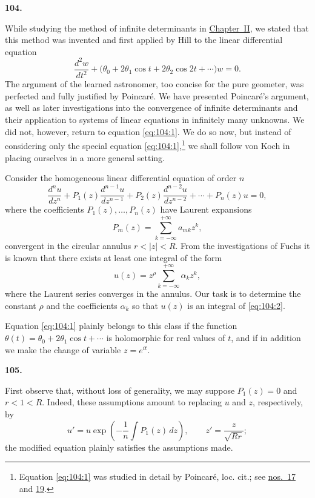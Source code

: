 \documentclass[
  paper=b5,
  fontsize=13pt,
  twoside=true,
  open=any,
  bookmarkpackage=false,
  chapterprefix=true,
  headings=normal
]{scrbook}
\theoremstyle{definition}
\newcommand{\numberedparagraph}[1]{%
  \par\medskip\phantomsection\label{sec:#1}%
  \noindent\textbf{#1.}\enspace
}
\begin{document}
\numberedparagraph{104}
While studying the method of infinite determinants in \hyperref[chap:2]{Chapter~II}, we stated
that this method was invented and first applied by Hill to the linear
differential equation
\begin{equation}
  \frac{d^2w}{dt^2}
  +\bigl(\theta_0+2\theta_1\cos t+2\theta_2\cos2t+\cdots\bigr)w=0.
  \tag{1}\label{eq:104:1}
\end{equation}
The argument of the learned astronomer, too concise for the pure geometer, was
perfected and fully justified by Poincaré.  We have presented Poincaré's
argument, as well as later investigations into the convergence of infinite
determinants and their application to systems of linear equations in
infinitely many unknowns.  We did not, however, return to equation
\eqref{eq:104:1}.  We do so now, but instead of considering only the special
equation \eqref{eq:104:1},\footnote{Equation \eqref{eq:104:1} was studied in
detail by Poincaré, loc. cit.; see \hyperref[sec:17]{nos.~17} and
\hyperref[sec:19]{19}.} we shall follow von Koch in placing ourselves in a
more general setting.

Consider the homogeneous linear differential equation of order \(n\)
\begin{equation}
  \frac{d^nu}{dz^n}+P_1(z)\frac{d^{n-1}u}{dz^{n-1}}
  +P_2(z)\frac{d^{n-2}u}{dz^{n-2}}+\cdots+P_n(z)u=0,
  \tag{2}\label{eq:104:2}
\end{equation}
where the coefficients \(P_1(z),\ldots,P_n(z)\) have Laurent expansions
\begin{equation}
  P_m(z)=\sum_{k=-\infty}^{+\infty}a_{mk}z^k,
  \tag{3}\label{eq:104:3}
\end{equation}
convergent in the circular annulus \(r<|z|<R\).  From the investigations of
Fuchs it is known that there exists at least one integral of the form
\[
  u(z)=z^\rho\sum_{k=-\infty}^{+\infty}\alpha_kz^k,
\]
where the Laurent series converges in the annulus.  Our task is to determine
the constant \(\rho\) and the coefficients \(\alpha_k\) so that \(u(z)\) is an
integral of \eqref{eq:104:2}.

Equation \eqref{eq:104:1} plainly belongs to this class if the function
\(\theta(t)=\theta_0+2\theta_1\cos t+\cdots\) is holomorphic for real values
of \(t\), and if in addition we make the change of variable \(z=e^{it}\).

\numberedparagraph{105}
First observe that, without loss of generality, we may suppose
\(P_1(z)=0\) and \(r<1<R\).  Indeed, these assumptions amount to replacing
\(u\) and \(z\), respectively, by
\[
  u'=u\exp\left(-\frac1n\int P_1(z)\,dz\right),
  \qquad z'=\frac{z}{\sqrt{Rr}};
\]
the modified equation plainly satisfies the assumptions made.
\end{document}
